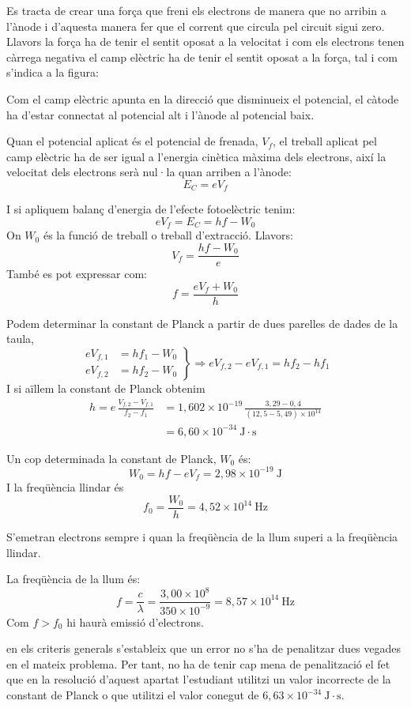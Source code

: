 \begin{solapartat}
 Es tracta de crear una força que freni els electrons de manera que no arribin a l'ànode i d'aquesta manera fer que el corrent que circula pel circuit sigui zero. Llavors la força ha de tenir el sentit oposat a la velocitat i com els electrons tenen càrrega negativa el camp elèctric ha de tenir el sentit oposat a la força, tal i com s'indica a la figura:


Com el camp elèctric apunta en la direcció que disminueix el potencial, el càtode ha d'estar connectat al potencial alt i l'ànode al potencial baix.

 Quan el potencial aplicat és el potencial de frenada, $V_f$, el treball aplicat pel camp elèctric ha de ser igual a l'energia cinètica màxima dels electrons, així la velocitat dels electrons serà nul·la quan arriben a l'ànode:
\[ E_C = eV_f \]

 I si apliquem balanç d'energia de l'efecte fotoelèctric tenim:
\[ eV_f = E_C = hf - W_0 \]
On $W_0$ és la funció de treball o treball d'extracció. Llavors:
\[ V_f = \frac{hf - W_0}{e} \]
També es pot expressar com:
\[ f = \frac{eV_f + W_0}{h} \]

 Podem determinar la constant de Planck a partir de dues parelles de dades de la taula,
\[ \left.\begin{aligned} eV_{f,1} &= hf_1 - W_0\\ eV_{f,2} &= hf_2 - W_0 \end{aligned}\right\} \Rightarrow eV_{f,2} - eV_{f,1} = hf_2 - hf_1 \]
I si aïllem la constant de Planck obtenim
\begin{align*}
h = e\,\frac{V_{f,2} - V_{f,1}}{f_2 - f_1} &= 1,602\times 10^{-19}\,\frac{3,29 - 0,4}{(12,5 - 5,49)\times 10^{14}}\\
&= 6,60\times 10^{-34}\ \mathrm{J\cdot s}
\end{align*}
\end{solapartat}

\begin{solapartat}
 Un cop determinada la constant de Planck, $W_0$ és:
\[ W_0 = hf - eV_f = 2,98\times 10^{-19}\ \mathrm{J} \]
I la freqüència llindar és
\[ f_0 = \frac{W_0}{h} = 4,52\times 10^{14}\ \mathrm{Hz} \]

 S'emetran electrons sempre i quan la freqüència de la llum superi a la freqüència llindar.

 La freqüència de la llum és:
\[ f = \frac{c}{\lambda} = \frac{3,00\times 10^{8}}{350\times 10^{-9}} = 8,57\times 10^{14}\ \mathrm{Hz} \]
Com $f > f_0$ hi haurà emissió d'electrons.

 en els criteris generals s'estableix que un error no s'ha de penalitzar dues vegades en el mateix problema. Per tant, no ha de tenir cap mena de penalització el fet que en la resolució d'aquest apartat l'estudiant utilitzi un valor incorrecte de la constant de Planck o que utilitzi el valor conegut de $6,63\times 10^{-34}\ \mathrm{J\cdot s}$.
\end{solapartat}
